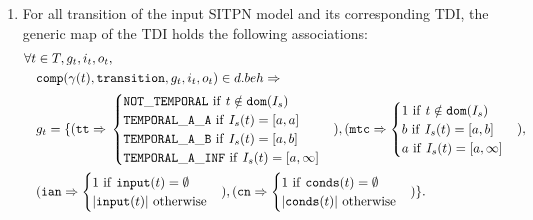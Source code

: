 \begin{definition}
\begin{enumerate}
  \item For all transition of the input SITPN model and its corresponding TDI, the generic map of the TDI holds the following associations:\\
    \begin{equation*}
      \begin{aligned}[t]
        \forall{}t&\in{}T,g_t,i_t,o_t, \\
                  & \mathtt{comp}(\gamma(t),\mathtt{transition},g_t,i_t,o_t)\in{}d.beh\Rightarrow \\
                  & g_t=\{(\mathtt{tt}\Rightarrow{}
                    \begin{cases}
                      \mathtt{NOT\_TEMPORAL}~\mathrm{if}~t\notin{}\mathtt{dom}(I_s) \\
                      \mathtt{TEMPORAL\_A\_A}~\mathrm{if}~I_s(t)=[a,a] \\
                      \mathtt{TEMPORAL\_A\_B}~\mathrm{if}~I_s(t)=[a,b] \\
                      \mathtt{TEMPORAL\_A\_INF}~\mathrm{if}~I_s(t)=[a,\infty] \\
                    \end{cases}),
        (\mathtt{mtc}\Rightarrow
        \begin{cases}
          1~\mathrm{if}~t\notin{}\mathtt{dom}(I_s) \\
          b~\mathrm{if}~I_s(t)=[a,b] \\
          a~\mathrm{if}~I_s(t)=[a,\infty] \\
        \end{cases}), \\
                  & (\mathtt{ian}\Rightarrow
                    \begin{cases}
                      1~\mathrm{if}~\mathtt{input}(t)=\emptyset \\
                      \vert{}\mathtt{input}(t)\vert~\mathrm{otherwise} \\
                    \end{cases}), 
        (\mathtt{cn}\Rightarrow
        \begin{cases}
          1~\mathrm{if}~\mathtt{conds}(t)=\emptyset \\
          \vert{}\mathtt{conds}(t)\vert~\mathrm{otherwise} \\
        \end{cases})\}. \\
      \end{aligned}
    \end{equation*}
    

\end{enumerate}
\end{definition}
